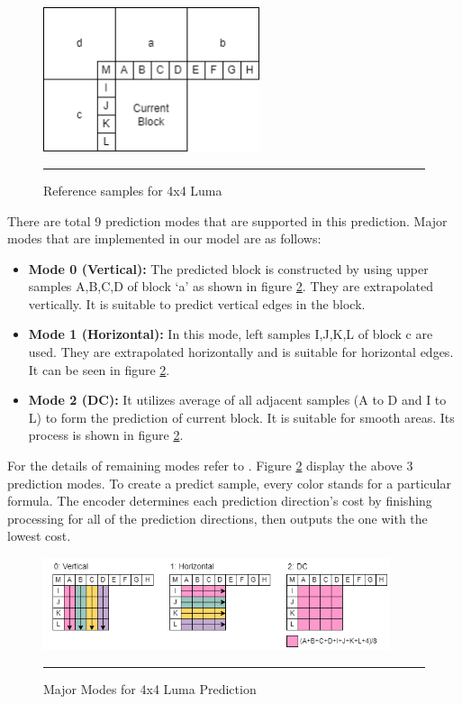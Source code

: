 \begin{figure}[htbp]
	\centering
	\includegraphics[width = 2.5in]{./Figures/4x4luma.png}
	\rule{35em}{0.5pt}
	\caption{Reference samples for 4x4 Luma}
	\label{fig:4x4xluma}
\end{figure}

There are total 9 prediction modes that are supported in this prediction. Major modes that are implemented in our model are as follows:

\begin{itemize}
	\item \textbf{Mode 0 (Vertical):} The predicted block is constructed by using upper samples A,B,C,D of block ‘a’ as shown in figure \ref{fig:3modes}. They are extrapolated vertically. It is suitable to predict vertical edges in the block.
	\item \textbf{Mode 1 (Horizontal):} In this mode, left samples I,J,K,L of block c are used. They are extrapolated horizontally and is suitable for horizontal edges. It can be seen in figure \ref{fig:3modes}.
	\item \textbf{Mode 2 (DC):} It utilizes average of all adjacent samples (A to D and I to L) to form the prediction of current block. It is suitable for smooth areas. Its process is shown in figure \ref{fig:3modes}.

\end{itemize}
	 
For the details of remaining modes refer to \cite{richardson2010h264}. Figure \ref{fig:3modes} display the above 3 prediction modes. To create a predict sample, every color stands for a particular formula. The encoder determines each prediction direction's cost by finishing processing for all of the prediction directions, then outputs the one with the lowest cost.

\begin{figure}[htbp]
	\centering
	\includegraphics[width = 4in]{./Figures/3modes.png}
	\rule{35em}{0.5pt}
	\caption{Major Modes for 4x4 Luma Prediction}
	\label{fig:3modes}
\end{figure}

